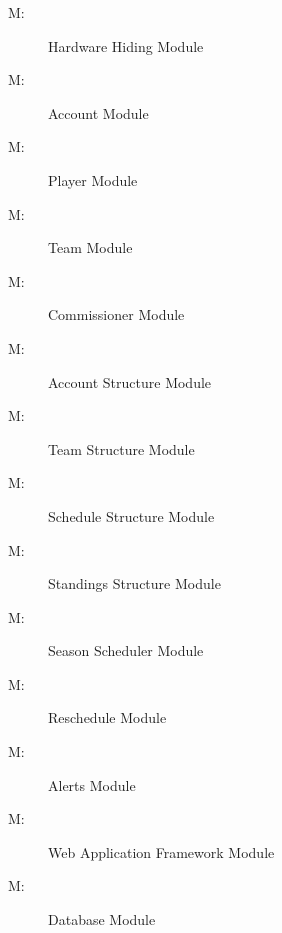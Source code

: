 \documentclass[12pt, titlepage]{article}
\newcounter{mnum}
\newcommand{\mthemnum}{M\themnum}
\begin{document}
\begin{description}
  \item [ \mthemnum \label{mHH}:] Hardware Hiding Module
  \item [ \mthemnum \label{mAC}:] Account Module
  \item [ \mthemnum \label{mPL}:] Player Module
  \item [ \mthemnum \label{mTE}:] Team Module
  \item [ \mthemnum \label{mCM}:] Commissioner Module
  \item [ \mthemnum \label{mAS}:] Account Structure
  Module
  \item [ \mthemnum \label{mTS}:] Team Structure Module
  \item [ \mthemnum \label{mSS}:] Schedule Structure
  Module
  \item [ \mthemnum \label{mST}:] Standings Structure
  Module
  \item [ \mthemnum \label{mS}:] Season Scheduler Module
  \item [ \mthemnum \label{mRE}:] Reschedule Module
  \item [ \mthemnum \label{mAL}:] Alerts Module
  \item [ \mthemnum \label{mWA}:] Web Application
  Framework Module
  \item [ \mthemnum \label{mDB}:] Database Module
\end{description}
\end{document}
